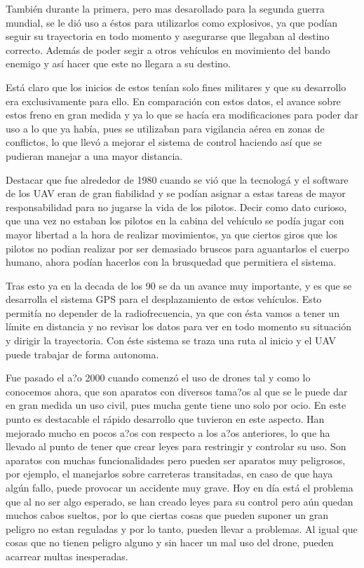 \documentclass{article}
\begin{document}
\hspace{1 cm} Tambi\'en durante la primera, pero mas desarollado para la segunda guerra mundial, se le di\'o uso a \'estos para utilizarlos como explosivos, ya que pod\'ian seguir su trayectoria en todo momento y asegurarse que llegaban al destino correcto. Adem\'as de poder segir a otros veh\'iculos en movimiento del bando enemigo y as\'i hacer que este no llegara a su destino. 

\hspace{1 cm} Est\'a claro que los inicios de estos ten\'ian solo fines militares y que su desarrollo era exclusivamente para ello. En comparaci\'on con estos datos, el avance sobre estos freno en gran medida y ya lo que se hac\'ia era modificaciones para poder dar uso a lo que ya hab\'ia, pues se utilizaban para vigilancia a\'erea en zonas de conflictos, lo que llev\'o a mejorar el sistema de control haciendo as\'i que se pudieran manejar a una mayor distancia. 

\hspace{1 cm}Destacar que fue alrededor de 1980 cuando se vi\'o que la tecnolog\'a y el software de los UAV eran de gran fiabilidad y se pod\'ian asignar a estas tareas de mayor responsabilidad para no jugarse la vida de los pilotos. Decir como dato curioso, que una vez no estaban los pilotos en la cabina del veh\'iculo se pod\'ia jugar con mayor libertad a la hora de realizar movimientos, ya que ciertos giros que los pilotos no podian realizar por ser demasiado bruscos para aguantarlos el cuerpo humano, ahora pod\'ian hacerlos con la brusquedad que permitiera el sistema.  

\hspace{1 cm} Tras esto ya en la decada de los 90 se da un avance muy importante, y es que se desarrolla el sistema GPS para el desplazamiento de estos veh\'iculos. Esto permit\'ia no depender de la radiofrecuencia, ya que con \'esta vamos a tener un l\'imite en distancia y no revisar los datos para ver en todo momento su situaci\'on y dirigir la trayectoria. Con \'este sistema se traza una ruta al inicio y el UAV puede trabajar de forma autonoma. 

\hspace{1 cm} Fue pasado el a?o 2000 cuando comenz\'o el uso de drones tal y como lo conocemos ahora, que son aparatos con diversos tama?os al que se le puede dar en gran medida un uso civil, pues mucha gente tiene uno solo por ocio. En este punto es destacable el r\'apido desarrollo que tuvieron en este aspecto. Han mejorado mucho en pocos a?os con respecto a los a?os anteriores, lo que ha llevado al punto de tener que crear leyes para restringir y controlar su uso. Son aparatos con muchas funcionalidades pero pueden ser aparatos muy peligrosos, por ejemplo, el manejarlos sobre carreteras transitadas, en caso de que haya alg\'un fallo, puede provocar un accidente muy grave. Hoy en d\'ia est\'a el problema que al no ser algo esperado, se han creado leyes para su control pero a\'un quedan muchos cabos sueltos, por lo que ciertas cosas que pueden suponer un gran peligro no estan reguladas y por lo tanto, pueden llevar a problemas. Al igual que cosas que no tienen peligro alguno y sin hacer un mal uso del drone, pueden acarrear multas inesperadas.
\end{document}
